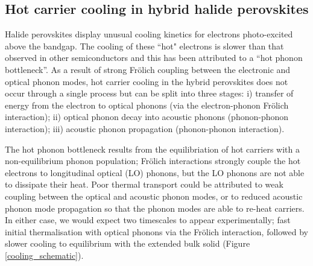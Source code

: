 \subsection{Hot carrier cooling in hybrid halide perovskites}

Halide perovskites display unusual cooling kinetics for electrons photo-excited above the bandgap.
The cooling of these ``hot" electrons is slower than that observed in other semiconductors and this has been attributed to a ``hot phonon bottleneck''.\autocite{Yang2016e,Yang2017a} %
As a result of strong Fr\"{o}lich coupling between the electronic and optical phonon modes, hot carrier cooling in the hybrid perovskites does not occur through a single process but can be split into three stages: i) transfer of energy from the electron to optical phonons (via the electron-phonon Fr\"{o}lich interaction); ii) optical phonon decay into acoustic phonons (phonon-phonon interaction); iii) acoustic phonon propagation (phonon-phonon interaction).

The hot phonon bottleneck results from the equilibriation of hot carriers with a non-equilibrium phonon population;
Fr\"{o}lich interactions strongly couple the hot electrons to longitudinal optical (LO) phonons, but the LO phonons are not able to dissipate their heat. 
Poor thermal transport could be attributed to weak coupling between the optical and acoustic phonon modes, or to reduced acoustic phonon mode propagation so that the phonon modes are able to re-heat carriers.
In either case, we would expect two timescales to appear experimentally; fast initial thermalisation with optical phonons via the Fr\"{o}lich interaction, followed by slower cooling to equilibrium with the extended bulk solid (Figure \ref{cooling_schematic}).

